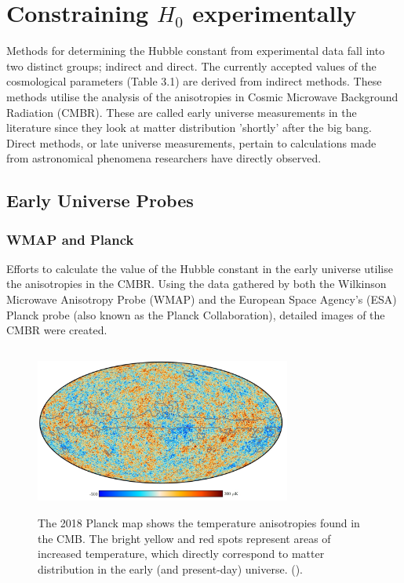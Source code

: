 \documentclass[12pt]{report}
\begin{document}
\chapter{Constraining $H_{0}$ experimentally}

\vspace{-0.75cm}

Methods for determining the Hubble constant from experimental data fall into two distinct groups; indirect and direct. The currently accepted values of the cosmological parameters (Table 3.1) are derived from indirect methods. These methods utilise the analysis of the anisotropies in Cosmic Microwave Background Radiation (CMBR). These are called early universe measurements in the literature since they look at matter distribution 'shortly' after the big bang. Direct methods, or late universe measurements, pertain to calculations made from astronomical phenomena researchers have directly observed. 

\section{Early Universe Probes}

\subsection{WMAP and Planck}

Efforts to calculate the value of the Hubble constant in the early universe utilise the anisotropies in the CMBR. Using the data gathered by both the Wilkinson Microwave Anisotropy Probe (WMAP) and the European Space Agency's (ESA) Planck probe (also known as the Planck Collaboration), detailed images of the CMBR were created.

\newpage

\begin{figure} [t]
    \centering
    \includegraphics[width = 0.75\textwidth, height = 5.5cm]{figure3.jpg}
    \caption{The 2018 Planck map shows the temperature anisotropies found in the CMB. The bright yellow and red spots represent areas of increased temperature, which directly correspond to matter distribution in the early (and present-day) universe. (\textcite{ESA2018}).}
    \label{fig:figure3}
\end{figure}
\end{document}
